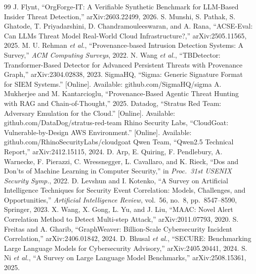 \documentclass[journal]{IEEEtran}
\begin{document}
\begin{thebibliography}{99}
 J. Flynt, ``OrgForge-IT: A Verifiable Synthetic Benchmark for LLM-Based Insider Threat Detection,'' arXiv:2603.22499, 2026.
 S. Munshi, S. Pathak, S. Ghatode, T. Priyadarshini, D. Chandramouleeswaran, and A. Rana, ``ACSE-Eval: Can LLMs Threat Model Real-World Cloud Infrastructure?,'' arXiv:2505.11565, 2025.
 M. U. Rehman \emph{et al.}, ``Provenance-based Intrusion Detection Systems: A Survey,'' \emph{ACM Computing Surveys}, 2022.
 N. Wang \emph{et al.}, ``TBDetector: Transformer-Based Detector for Advanced Persistent Threats with Provenance Graph,'' arXiv:2304.02838, 2023.
 SigmaHQ, ``Sigma: Generic Signature Format for SIEM Systems.'' [Online]. Available: github.com/SigmaHQ/sigma
 A. Mukherjee and M. Kantarcioglu, ``Provenance-Based Agentic Threat Hunting with RAG and Chain-of-Thought,'' 2025.
 Datadog, ``Stratus Red Team: Adversary Emulation for the Cloud.'' [Online]. Available: github.com/DataDog/stratus-red-team
 Rhino Security Labs, ``CloudGoat: Vulnerable-by-Design AWS Environment.'' [Online]. Available: github.com/RhinoSecurityLabs/cloudgoat
 Qwen Team, ``Qwen2.5 Technical Report,'' arXiv:2412.15115, 2024.
 D. Arp, E. Quiring, F. Pendlebury, A. Warnecke, F. Pierazzi, C. Wressnegger, L. Cavallaro, and K. Rieck, ``Dos and Don'ts of Machine Learning in Computer Security,'' in \emph{Proc.\ 31st USENIX Security Symp.}, 2022.
 D. Levshun and I. Kotenko, ``A Survey on Artificial Intelligence Techniques for Security Event Correlation: Models, Challenges, and Opportunities,'' \emph{Artificial Intelligence Review}, vol.\ 56, no.\ 8, pp.\ 8547--8590, Springer, 2023.
 X. Wang, X. Gong, L. Yu, and J. Liu, ``MAAC: Novel Alert Correlation Method to Detect Multi-step Attack,'' arXiv:2011.07793, 2020.
 S. Freitas and A. Gharib, ``GraphWeaver: Billion-Scale Cybersecurity Incident Correlation,'' arXiv:2406.01842, 2024.
 D. Bhusal \emph{et al.}, ``SECURE: Benchmarking Large Language Models for Cybersecurity Advisory,'' arXiv:2405.20441, 2024.
 S. Ni \emph{et al.}, ``A Survey on Large Language Model Benchmarks,'' arXiv:2508.15361, 2025.
\end{thebibliography}
\end{document}
